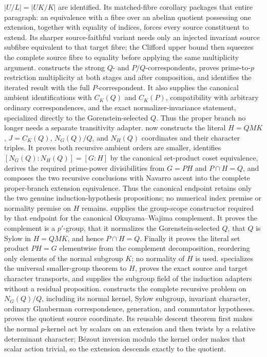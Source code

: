 \documentclass[11pt]{article}
\begin{document}
\(|U/L|=|UK/K|\) are identified.  Its matched-fibre corollary packages
that entire paragraph: an equivalence with a fibre over an abelian
quotient possessing one extension, together with equality of indices,
forces every source constituent to extend.  Its sharper source-faithful
variant needs only an injected invariant source subfibre equivalent to
that target fibre; the Clifford upper bound then squeezes the complete
source fibre to equality before applying the same multiplicity argument.
 constructs the
strong \(Q\)- and \(P/Q\)-correspondents, proves prime-to-\(p\)
restriction multiplicity at both stages and after composition, and
identifies the iterated result with the full \(P\)-correspondent.  It also
supplies the canonical ambient identifications with \(C_K(Q)\) and
\(C_K(P)\), compatibility with arbitrary ordinary correspondences, and
the exact normalizer-invariance statement, specialized directly to the
Gorenstein-selected \(Q\).  Thus the proper branch no longer needs a
separate transitivity adapter.
 now constructs
the literal \(H=QMK\), \(J=C_K(Q)\), \(N_G(Q)/Q\), and \(N_H(Q)\)
coordinates and their character triples.  It proves both recursive
ambient orders are smaller, identifies
\([N_G(Q):N_H(Q)]=[G:H]\) by the canonical set-product coset
equivalence, derives the required prime-power divisibilities from
\(G=PH\) and \(P\cap H=Q\), and composes the two
recursive conclusions with Navarro ascent into the complete proper-branch
extension equivalence.  Thus the canonical endpoint retains only the two
genuine induction-hypothesis propositions; no numerical index premise
or normality premise on \(H\) remains.
 supplies the
group-scope constructor required by that endpoint for the canonical
Okuyama--Wajima complement.  It proves the complement is a \(p'\)-group,
that it normalizes the Gorenstein-selected \(Q\), that \(Q\) is Sylow in
\(H=QMK\), and hence \(P\cap H=Q\).  Finally it proves the literal set
product \(PH=G\) elementwise from the complement decomposition, reordering
only elements of the normal subgroup \(K\); no normality of \(H\) is used.
specializes the universal smaller-group theorem to \(H\), proves the exact
source and target character transports, and supplies the subgroup field of
the induction adapters without a residual proposition.
constructs the complete recursive problem on \(N_G(Q)/Q\), including its
normal kernel, Sylow subgroup, invariant character, ordinary Glauberman
correspondence, generation, and commutator hypotheses.
proves the quotient source coordinate.  Its reusable descent theorem first
makes the normal \(p\)-kernel act by scalars on an extension and then twists
by a relative determinant character; Bézout inversion modulo the kernel
order makes that scalar action trivial, so the extension descends exactly
to the quotient.
\end{document}
